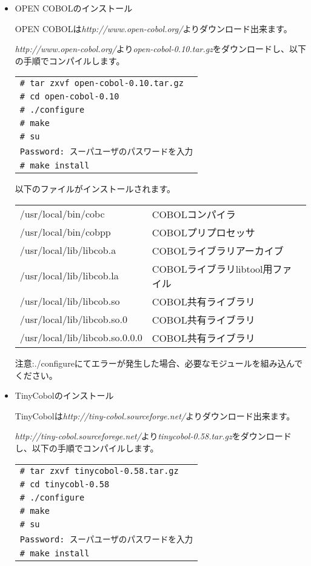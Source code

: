 \begin{itemize}

\item{OPEN COBOLのインストール}

OPEN COBOLは{\it http://www.open-cobol.org/}よりダウンロード出来ます。

{\it http://www.open-cobol.org/}より{\it open-cobol-0.10.tar.gz}をダウンロードし、以下の手順でコンパイルします。

\begin{tabular}{|l|}
\hline
\verb+# tar zxvf open-cobol-0.10.tar.gz+\\
\verb+# cd open-cobol-0.10+\\
\verb+# ./configure+\\
\verb+# make+\\
\verb+# su+\\
\verb+Password: スーパユーザのパスワードを入力+\\
\verb+# make install+\\
\hline
\end{tabular}

以下のファイルがインストールされます。

\begin{tabular}{ll}
/usr/local/bin/cobc           &COBOLコンパイラ\\
/usr/local/bin/cobpp          &COBOLプリプロセッサ\\
/usr/local/lib/libcob.a       &COBOLライブラリアーカイブ \\
/usr/local/lib/libcob.la      &COBOLライブラリlibtool用ファイル\\
/usr/local/lib/libcob.so      &COBOL共有ライブラリ\\
/usr/local/lib/libcob.so.0    &COBOL共有ライブラリ\\
/usr/local/lib/libcob.so.0.0.0&COBOL共有ライブラリ\\
\end{tabular}

注意:./configureにてエラーが発生した場合、必要なモジュールを組み込んでください。

\item{TinyCobolのインストール}

TinyCobolは{\it http://tiny-cobol.sourceforge.net/}よりダウンロード出来ます。

{\it http://tiny-cobol.sourceforege.net/}より{\it tinycobol-0.58.tar.gz}をダウンロードし、以下の手順でコンパイルします。

\begin{tabular}{|l|}
\hline
\verb+# tar zxvf tinycobol-0.58.tar.gz+\\
\verb+# cd tinycobl-0.58+\\
\verb+# ./configure+\\
\verb+# make+\\
\verb+# su+\\
\verb+Password: スーパユーザのパスワードを入力+\\
\verb+# make install+\\
\hline
\end{tabular}


\end{itemize}
